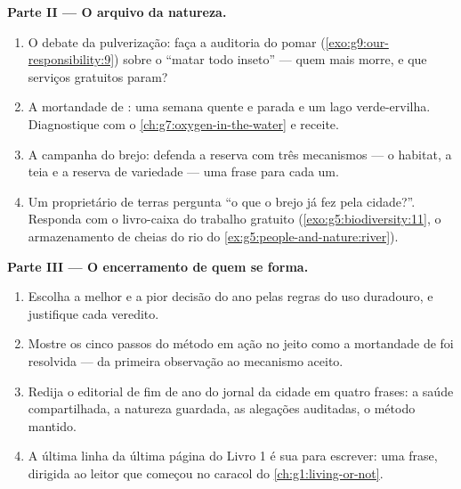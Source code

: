 \begin{problem}
\medskip\noindent\textbf{Parte II --- O arquivo da natureza.}
\begin{enumerate}[resume]
  \item O debate da pulverização: faça a auditoria do pomar
        (\cref{exo:g9:our-responsibility:9}) sobre o ``matar
        todo inseto'' --- quem mais morre, e que serviços
        gratuitos param?
  \item A mortandade de : uma semana quente e parada e
        um lago verde-ervilha. Diagnostique com o
        \cref{ch:g7:oxygen-in-the-water} e receite.
  \item A campanha do brejo: defenda a reserva com três
        mecanismos --- o habitat, a teia e a reserva de
        variedade --- uma frase para cada um.
  \item Um proprietário de terras pergunta ``o que o brejo já
        fez pela cidade?''. Responda com o livro-caixa do
        trabalho gratuito (\cref{exo:g5:biodiversity:11}, o
        armazenamento de cheias do rio do
        \cref{ex:g5:people-and-nature:river}).
\end{enumerate}

\medskip\noindent\textbf{Parte III --- O encerramento de quem
se forma.}
\begin{enumerate}[resume]
  \item Escolha a melhor e a pior decisão do ano pelas regras
        do uso duradouro, e justifique cada veredito.
  \item Mostre os cinco passos do método em ação no jeito
        como a mortandade de  foi resolvida --- da
        primeira observação ao mecanismo aceito.
  \item Redija o editorial de fim de ano do jornal da cidade
        em quatro frases: a saúde compartilhada, a natureza
        guardada, as alegações auditadas, o método mantido.
  \item A última linha da última página do Livro 1 é sua para
        escrever: uma frase, dirigida ao leitor que começou
        no caracol do \cref{ch:g1:living-or-not}.
\end{enumerate}
\end{problem}

